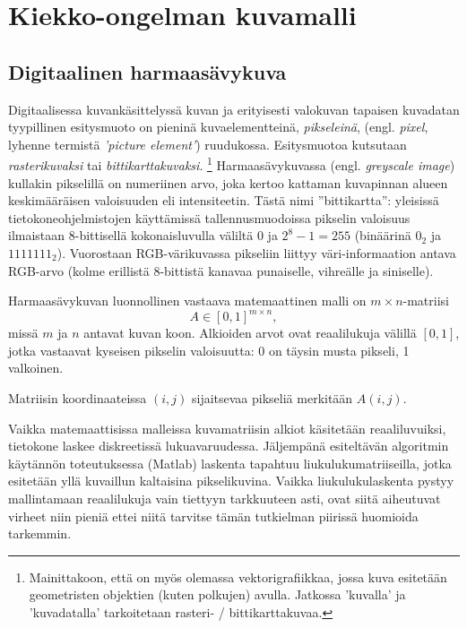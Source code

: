 \chapter{Kiekko-ongelman kuvamalli}
\label{cha:kuvamalli_ja_aineisto}

\section{Digitaalinen harmaasävykuva}
\label{sec:digitaalinen_kuva}

Digitaalisessa kuvankäsittelyssä kuvan ja erityisesti valokuvan tapaisen kuvadatan tyypillinen esitysmuoto on pieninä kuvaelementteinä, \emph{pikseleinä}, (engl. \emph{pixel}, lyhenne termistä \emph{'picture element'}) ruudukossa.
Esitysmuotoa kutsutaan \emph{rasterikuvaksi} tai \emph{bittikarttakuvaksi}.
\footnote{Mainittakoon, että on myös olemassa vektorigrafiikkaa, jossa kuva esitetään geometristen objektien (kuten polkujen) avulla.
Jatkossa 'kuvalla' ja 'kuvadatalla' tarkoitetaan rasteri- / bittikarttakuvaa.}
Harmaasävykuvassa (engl. \emph{greyscale image}) kullakin pikselillä on numeriinen arvo, joka kertoo kattaman kuvapinnan alueen keskimääräisen valoisuuden eli intensiteetin.
Tästä nimi ''bittikartta'':
yleisissä tietokoneohjelmistojen käyttämissä tallennusmuodoissa pikselin valoisuus ilmaistaan 8-bittisellä kokonaisluvulla väliltä $0$ ja $2^8 -1 = 255$ (binäärinä $0_2$ ja $1111111_2$).
Vuorostaan RGB-värikuvassa pikseliin liittyy väri-informaation antava RGB-arvo (kolme erillistä 8-bittistä kanavaa punaiselle, vihreälle ja siniselle).

Harmaasävykuvan luonnollinen vastaava matemaattinen malli on $m \times n$-matriisi
\begin{equation}
    A \in [0, 1]^{m \times n},
\end{equation}
missä $m$ ja $n$ antavat kuvan koon.
Alkioiden arvot ovat reaalilukuja välillä $[0, 1]$, jotka vastaavat kyseisen pikselin valoisuutta: 0 on täysin musta pikseli, 1 valkoinen.
\cite[29--32]{jähne}

Matriisin koordinaateissa $(i,j)$ sijaitsevaa pikseliä merkitään $A(i,j)$.

Vaikka matemaattisissa malleissa kuvamatriisin alkiot käsitetään reaaliluvuiksi, tietokone laskee diskreetissä lukuavaruudessa.
Jäljempänä esiteltävän algoritmin käytännön toteutuksessa (Matlab) laskenta tapahtuu liukulukumatriiseilla, jotka esitetään yllä kuvaillun kaltaisina pikselikuvina.
Vaikka liukulukulaskenta pystyy mallintamaan reaalilukuja vain tiettyyn tarkkuuteen asti,
ovat siitä aiheutuvat virheet niin pieniä ettei niitä tarvitse tämän tutkielman piirissä huomioida tarkemmin.

